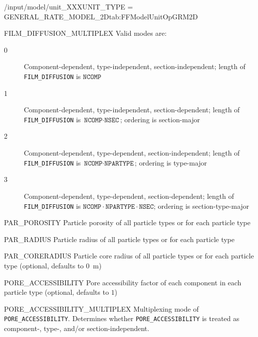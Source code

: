 \begin{condsubgroup}{/input/model/unit\_XXX}{UNIT\_TYPE = GENERAL\_RATE\_MODEL\_2D}{tab:FFModelUnitOpGRM2D}
\begin{dataset}[unit=--,type=int,range={$\{0, \dots, 3 \}$},length={1}]{FILM\_DIFFUSION\_MULTIPLEX}
    Valid modes are:
    \begin{description}
      \item[0] Component-dependent, type-independent, section-independent; length of \texttt{FILM\_DIFFUSION} is $\texttt{NCOMP}$
      \item[1] Component-dependent, type-independent, section-dependent; length of \texttt{FILM\_DIFFUSION} is $\texttt{NCOMP} \cdot \texttt{NSEC}$; ordering is section-major
      \item[2] Component-dependent, type-dependent, section-independent; length of \texttt{FILM\_DIFFUSION} is $\texttt{NCOMP} \cdot \texttt{NPARTYPE}$; ordering is type-major
      \item[3] Component-dependent, type-dependent, section-dependent; length of \texttt{FILM\_DIFFUSION} is $\texttt{NCOMP} \cdot \texttt{NPARTYPE} \cdot \texttt{NSEC}$; ordering is section-type-major
    \end{description}\vspace{-\baselineskip}
  \end{dataset}
  \begin{dataset}[unit=--,type=double,range={$(0,1]$},length={$1$ / \texttt{NPARTYPE}}]{PAR\_POROSITY}
    Particle porosity of all particle types or for each particle type
  \end{dataset}
  \begin{dataset}[unit=\si{\metre},type=double,range={$>0$},length={$1$ / \texttt{NPARTYPE}}]{PAR\_RADIUS}
    Particle radius of all particle types or for each particle type
  \end{dataset}
  \begin{dataset}[unit=\si{\metre},type=double,range={$[0, \texttt{PAR\_RADIUS})$},length={$1$ / \texttt{NPARTYPE}}]{PAR\_CORERADIUS}
    Particle core radius of all particle types or for each particle type (optional, defaults to \SI{0}{\metre})
  \end{dataset}
  \begin{dataset}[unit=--,type=double,range={$(0, 1]$},length={see \texttt{PORE\_ACCESSIBILITY\_MULTIPLEX}}]{PORE\_ACCESSIBILITY}
    Pore accessibility factor of each component in each particle type (optional, defaults to $1$)
  \end{dataset}
  \begin{dataset}[unit=--,type=int,range={$\{0, \dots, 3 \}$},length={1}]{PORE\_ACCESSIBILITY\_MULTIPLEX}
    Multiplexing mode of \texttt{PORE\_ACCESSIBILITY}.
    Determines whether \texttt{PORE\_ACCESSIBILITY} is treated as component-, type-, and/or section-independent.


\end{dataset}
\end{condsubgroup}
